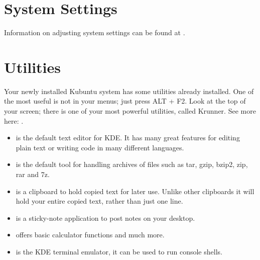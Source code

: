 \documentclass[letterpaper,10pt,english]{sphinxmanual}
\begin{document}
\section{System Settings}
\label{\detokenize{docs/software:system-settings}}
Information on adjusting system settings can be found at .


\section{Utilities}
\label{\detokenize{docs/software:utilities}}
Your newly installed Kubuntu system has some utilities already installed. One of the most useful is not in your menus; just press ALT + F2. Look at the top of your screen; there is one of your most powerful utilities, called Krunner. See more here: .
\begin{itemize}
\item {} 
 is the default text editor for KDE. It has many great features for editing plain text or writing code in many different languages.

\item {} 
 is the default tool for handling archives of files such as tar, gzip, bzip2, zip, rar and 7z.

\item {} 
 is a clipboard to hold copied text for later use. Unlike other clipboards it will hold your entire copied text, rather than just one line.

\item {} 
 is a sticky-note application to post notes on your desktop.

\item {} 
 offers basic calculator functions and much more.

\item {} 
 is the KDE terminal emulator, it can be used to run console shells.

\end{itemize}
\end{document}
